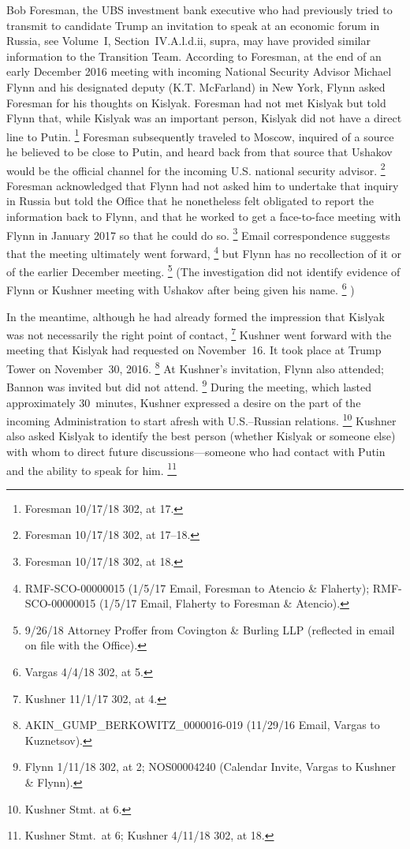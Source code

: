Bob Foresman, the UBS investment bank executive who had previously tried to transmit to candidate Trump an invitation to speak at an economic forum in Russia, see Volume~I, Section~IV.A.l.d.ii, supra, may have provided similar information to the Transition Team.
According to Foresman, at the end of an early December 2016 meeting with incoming National Security Advisor Michael Flynn and his designated deputy (K.T. McFarland) in New York, Flynn asked Foresman for his thoughts on Kislyak.
Foresman had not met Kislyak but told Flynn that, while Kislyak was an important person, Kislyak did not have a direct line to Putin.%
\footnote{Foresman 10/17/18 302, at 17.}
Foresman subsequently traveled to Moscow, inquired of a source he believed to be close to Putin, and heard back from that source that Ushakov would be the official channel for the incoming U.S. national security advisor.%
\footnote{Foresman 10/17/18 302, at 17--18.}
Foresman acknowledged that Flynn had not asked him to undertake that inquiry in Russia but told the Office that he nonetheless felt obligated to report the information back to Flynn, and that he worked to get a face-to-face meeting with Flynn in January 2017 so that he could do so.%
\footnote{Foresman 10/17/18 302, at 18.}
Email correspondence suggests that the meeting ultimately went forward,%
\footnote{RMF-SCO-00000015 (1/5/17 Email, Foresman to Atencio \& Flaherty);
RMF-SCO-00000015 (1/5/17 Email, Flaherty to Foresman \& Atencio).}
but Flynn has no recollection of it or of the earlier December meeting.%
\footnote{9/26/18 Attorney Proffer from Covington \& Burling LLP (reflected in email on file with the Office).}
(The investigation did not identify evidence of Flynn or Kushner meeting with Ushakov after being given his name.%
\footnote{Vargas 4/4/18 302, at 5.}%
)

In the meantime, although he had already formed the impression that Kislyak was not necessarily the right point of contact,%
\footnote{Kushner 11/1/17 302, at 4.}
Kushner went forward with the meeting that Kislyak had requested on November~16. It took place at Trump Tower on November~30, 2016.%
\footnote{AKIN\_GUMP\_BERKOWITZ\_0000016-019 (11/29/16 Email, Vargas to Kuznetsov).}
At Kushner's invitation, Flynn also attended; Bannon was invited but did not attend.%
\footnote{Flynn 1/11/18 302, at 2;
NOS00004240 (Calendar Invite, Vargas to Kushner \& Flynn).}
During the meeting, which lasted approximately 30~minutes, Kushner expressed a desire on the part of the incoming Administration to start afresh with U.S.--Russian relations.%
\footnote{Kushner Stmt. at 6.}
Kushner also asked Kislyak to identify the best person (whether Kislyak or someone else) with whom to direct future discussions---someone who had contact with Putin and the ability to speak for him.%
\footnote{Kushner Stmt.\ at 6;
Kushner 4/11/18 302, at 18.}

